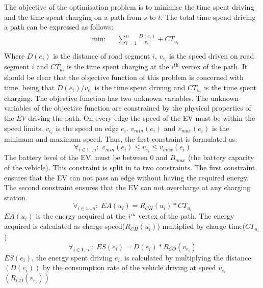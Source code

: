 The objective of the optimisation problem is to minimise the time spent driving
and the time spent charging on a path from $s$ to $t$. The total time spend driving a path can be expressed as follows:
\begin{equation*}
\begin{aligned} &
{\text{min:}}
& & \sum_{i=1}^{n} \frac{D(e_i)}{v_{e_i}} + CT_{u_i} \\
\end{aligned}
\end{equation*}\label{eq:objfunction}
Where $D(e_i)$ is the distance of road segment $i$, $v_{e_i}$ is the speed driven on road segment $i$ and $CT_{u_i}$ is the time spent charging at the $i^{\text{th}}$ vertex of the path. It should be clear that the objective function of this problem is concerned with time, being that \( D(e_i)/v_{e_i} \) is the time spent driving and $CT_{u_i}$ is the time spent charging. The objective function has two unknown variables. The unknown variables of the objective function are constrained by the physical properties of the $EV$ driving the path.
On every edge the speed of the EV must be within the speed limits. $v_{e_i}$ is the speed on edge $e_i$. $v_{min}(e_i)$ and $v_{max}(e_i)$ is the minimum and maximum speed. Thus, the first constraint is formulated as:
\begin{equation*}
\forall_{i\in1 \dots n }:\;v_{min}(e_i) \leq v_{e_i} \leq v_{max}(e_i)
\end{equation*}
The battery level of the EV, must be between $0$ and $B_{max}$ (the battery capacity of the vehicle).
This constraint is split in to two constraints. The first constraint ensures that the EV can not pass an edge without having the required energy. The second constraint ensures that the EV can not overcharge at any charging station.
\begin{equation*}
\forall_{i\in1 \dots n }:\; EA(u_i) = R_{CH}(u_i) * CT_{u_i}
\end{equation*}
$EA(u_i)$ is the energy acquired at the $i^{\text{\tiny th}}$ vertex of the path. The energy acquired is calculated as charge speed($R_{CH}(u_i)$) multiplied by charge time($CT_{u_i}$)
\begin{equation*}
\forall_{i\in1 \dots n }:\; ES(e_i) = D(e_i)*R_{CO}(v_{e_i})
\end{equation*}
$ES(e_i)$, the energy spent driving $e_i$, is calculated by multiplying the distance $(D(e_i))$ by the consumption rate of the vehicle driving at speed $v_{e_i}$ $(R_{CO}(v_{e_i}))$

